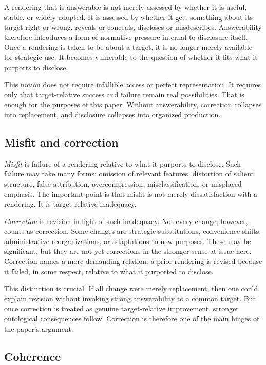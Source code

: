 \documentclass[11pt]{article}
\renewcommand{\emph}[1]{\textit{#1}}
\begin{document}
A rendering that is answerable is not merely assessed by whether it is useful, stable, or widely adopted. It is assessed by whether it gets something about its target right or wrong, reveals or conceals, discloses or misdescribes. Answerability therefore introduces a form of normative pressure internal to disclosure itself. Once a rendering is taken to be about a target, it is no longer merely available for strategic use. It becomes vulnerable to the question of whether it fits what it purports to disclose.

This notion does not require infallible access or perfect representation. It requires only that target-relative success and failure remain real possibilities. That is enough for the purposes of this paper. Without answerability, correction collapses into replacement, and disclosure collapses into organized production.

\subsection{Misfit and correction}

\emph{Misfit} is failure of a rendering relative to what it purports to disclose. Such failure may take many forms: omission of relevant features, distortion of salient structure, false attribution, overcompression, misclassification, or misplaced emphasis. The important point is that misfit is not merely dissatisfaction with a rendering. It is target-relative inadequacy.

\emph{Correction} is revision in light of such inadequacy. Not every change, however, counts as correction. Some changes are strategic substitutions, convenience shifts, administrative reorganizations, or adaptations to new purposes. These may be significant, but they are not yet corrections in the stronger sense at issue here. Correction names a more demanding relation: a prior rendering is revised because it failed, in some respect, relative to what it purported to disclose.

This distinction is crucial. If all change were merely replacement, then one could explain revision without invoking strong answerability to a common target. But once correction is treated as genuine target-relative improvement, stronger ontological consequences follow. Correction is therefore one of the main hinges of the paper's argument.

\subsection{Coherence}
\end{document}
